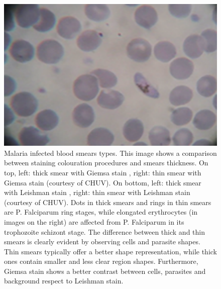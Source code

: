 \documentclass[sensors,review,accept,moreauthors,pdftex,10pt,a4paper]{mdpi}
\begin{document}
\begin{figure}[H]
	\includegraphics[height=0.17\textheight]{img/f3_ThinLeishman}
	\caption{\label{fig:thick_thin_film}Malaria infected blood smears types. This image shows a comparison between staining colouration procedures and smears thickness.
	On top, left: thick smear with Giemsa stain \cite{Sathpathi2014}, right: thin smear with Giemsa stain (courtesy of CHUV). On bottom, left: thick smear with Leishman stain \cite{Sathpathi2014}, right: thin smear with Leishman stain (courtesy of CHUV). Dots in thick smears and rings in thin smears are P. Falciparum ring stages, while elongated erythrocytes (in images on the right) are affected from P. Falciparum in its trophozoite schizont stage. The difference between thick and thin smears is clearly evident by observing cells and parasite shapes. Thin smears typically offer a better shape representation, while thick ones contain smaller and less clear region shapes. Furthermore, Giemsa stain shows a better contrast between cells, parasites and background respect to Leishman stain.}
\end{figure}
\end{document}
